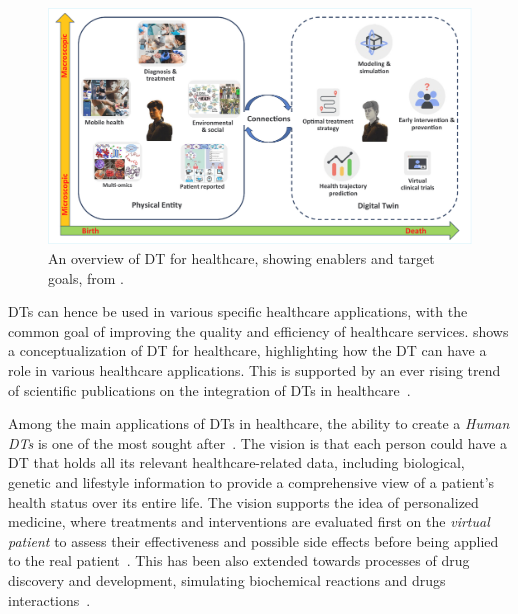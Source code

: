 \begin{figure}
    \centering
    \includegraphics[width=\textwidth]{figures/dt4h_overview.pdf}
    \caption{An overview of \ac{DT} for healthcare, showing enablers and target goals, from \cite{Katsoulakis_Wang_Wu_Shahriyari_Fletcher_Liu_Achenie_Liu_Jackson_Xiao_et_al._2024}.}
    \label{fig:dt-healthcare-overview}
\end{figure}

\acp{DT} can hence be used in various specific healthcare applications, with the common goal of improving the quality and efficiency of healthcare services.
%
 shows a conceptualization of \ac{DT} for healthcare, highlighting how the \ac{DT} can have a role in various healthcare applications.
This is supported by an ever rising trend of scientific publications on the integration of \acp{DT} in healthcare~\cite{Katsoulakis_Wang_Wu_Shahriyari_Fletcher_Liu_Achenie_Liu_Jackson_Xiao_et_al._2024}.

Among the main applications of \acp{DT} in healthcare, the ability to create a \emph{Human \acp{DT}} is one of the most sought after~\cite{Shengli_2021}.
%
The vision is that each person could have a \ac{DT} that holds all its relevant healthcare-related data, including biological, genetic and lifestyle information to provide a comprehensive view of a patient's health status over its entire life. 
%
The vision supports the idea of personalized medicine, where treatments and interventions are evaluated first on the \emph{virtual patient} to assess their effectiveness and possible side effects before being applied to the real patient~\cite{Kamel_Boulos_Zhang_2021,Björnsson_Borrebaeck_Elander_Gasslander_Gawel_Gustafsson_Jörnsten_Lee_Li_Lilja_et_al._2019}.
%
This has been also extended towards processes of drug discovery and development, simulating biochemical reactions and drugs interactions~\cite{Katsoulakis_Wang_Wu_Shahriyari_Fletcher_Liu_Achenie_Liu_Jackson_Xiao_et_al._2024}.

